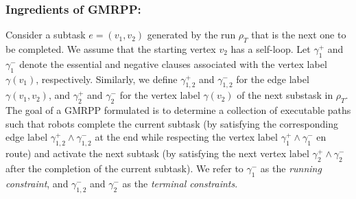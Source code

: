 \documentclass[Afour,sageh,times]{sagej}
\begin{document}
{\subsubsection{Ingredients of GMRPP:}\label{sec:gmmpp1} Consider a subtask $e = (v_1, v_2)$ generated by the run $\rho_T$ that is the next one to be completed. We assume that the starting vertex $v_2$ has a self-loop. Let $\gamma_1^+$ and $\gamma_1^-$ denote the essential and negative clauses associated with the vertex label $\gamma(v_1)$, respectively. Similarly, we define  $\gamma_{1,2}^{+}$ and $\gamma_{1,2}^{-}$  for the edge label $\gamma(v_1, v_2)$, and  $\gamma_2^+$ and $\gamma_2^-$ for the vertex label $\gamma(v_2)$ of the next substask in $\rho_T$. The goal of a GMRPP formulated  is to determine a collection of executable paths such that robots complete the current subtask (by satisfying the corresponding edge label $\gamma_{1,2}^+ \wedge \gamma_{1,2}^-$ at the end while respecting the vertex label $\gamma_1^+ \wedge \gamma_1^-$ en route) and activate the next subtask (by satisfying the next vertex label $\gamma_2^{+}\wedge \gamma_2^{-}$ after the completion of the current subtask). We refer to $\gamma_1^-$ as the {\it running constraint}, and $\gamma_{1,2}^- $ and $ \gamma_2^{-}$ as the {\it terminal constraints}.


}
\end{document}

